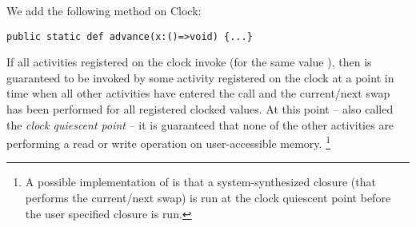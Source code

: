 We add the following method on Clock:
\begin{lstlisting}
public static def advance(x:()=>void) {...}
\end{lstlisting}

If all activities registered on the clock invoke 
(for the same value ), then  is guaranteed to be
invoked by some activity  registered on the clock at a point in time
when all other activities have entered the  call
and the current/next swap has been performed for all registered
clocked values.  At this point -- also called the {\em clock quiescent
point} -- it is guaranteed that none of the other activities are
performing a read or write operation on user-accessible memory.
\footnote{
A possible implementation of 
is that a system-synthesized closure (that
performs the current/next swap) is run at the clock quiescent point
before the user specified closure is run.}
